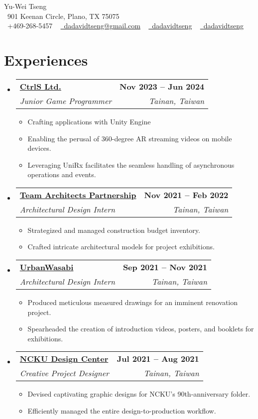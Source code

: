 \documentclass[letterpaper,11pt]{article}
\makeatletter
\newcommand{\resumeItem}[1]{
    \item\small{
            {#1 \vspace{-2pt}}
    }
}
\newcommand{\resumeSubheading}[4]{
    \vspace{-2pt}\item
    \begin{tabular*}{1.0\textwidth}[t]{l@{\extracolsep{\fill}}r}
    \textbf{#1} & \textbf{\small #2} \\
    \textit{\small#3} & \textit{\small #4} \\
    \end{tabular*}\vspace{-7pt}
}
\newcommand{\resumeSubHeadingListStart}{\begin{itemize}[leftmargin=0.0in, label={}]}
\newcommand{\resumeSubHeadingListEnd}{\end{itemize}}
\newcommand{\resumeItemListStart}{\begin{itemize}}
\newcommand{\resumeItemListEnd}{\end{itemize}\vspace{-5pt}}
\makeatother
\begin{document}
\begin{center}
{\Huge Yu-Wei Tseng}
\\ \vspace{1pt}
\small
\faHouseUser\ 901 Keenan Circle, Plano, TX 75075 \\ \vspace{1pt}
\raisebox{-0.1\height}\faPhone\ +469-268-5457 ~
\href{mailto:dadavidtseng@gmail.com}{\faEnvelope\ dadavidtseng@gmail.com} ~
\href{https://linkedin.com/in/dadavidtseng}{\faLinkedin\ dadavidtseng}  ~
\href{https://github.com/dadavidtseng}{\faGithub\ dadavidtseng}
\vspace{-8pt}
\end{center}





\section{Experiences}
\resumeSubHeadingListStart
\resumeSubheading
{\href{https://www.ctrls1890.com/}{CtrlS Ltd.}}{Nov 2023 -- Jun 2024}{Junior Game Programmer}{Tainan, Taiwan}
\resumeItemListStart
\resumeItem{Crafting applications with Unity Engine}
\resumeItem{Enabling the perusal of 360-degree AR streaming videos on mobile devices.}
\resumeItem{Leveraging UniRx facilitates the seamless handling of asynchronous operations and events.}
\resumeItemListEnd

\resumeSubheading
{\href{https://www.tap-arch.tw/en}
{Team Architects Partnership}}{Nov 2021 -- Feb 2022}
{Architectural Design Intern}{Tainan, Taiwan}
\resumeItemListStart
\resumeItem{Strategized and managed construction budget inventory.}
\resumeItem{Crafted intricate architectural models for project exhibitions.}
\resumeItemListEnd

\resumeSubheading
{\href{https://www.urbanwasabi.com.tw/}
{UrbanWasabi}}{Sep 2021 -- Nov 2021}
{Architectural Design Intern}{Tainan, Taiwan}
\resumeItemListStart
\resumeItem{Produced meticulous measured drawings for an imminent renovation project.}
\resumeItem{Spearheaded the creation of introduction videos, posters, and booklets for exhibitions.}
\resumeItemListEnd

\resumeSubheading
{\href{https://www.nckudc.com.tw/}
{NCKU Design Center}}{Jul 2021 -- Aug 2021}
{Creative Project Designer}{Tainan, Taiwan}
\resumeItemListStart
\resumeItem{Devised captivating graphic designs for NCKU's 90th-anniversary folder.}
\resumeItem{Efficiently managed the entire design-to-production workflow.}
\resumeItemListEnd
\resumeSubHeadingListEnd
\end{document}
